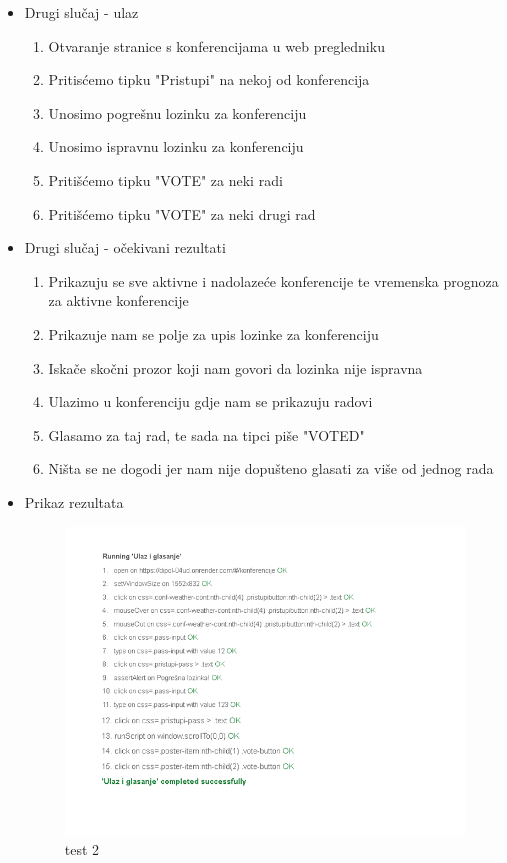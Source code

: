 			 \begin{itemize}
			 	\item Drugi slučaj - ulaz
			 	\begin{enumerate}
			 		\item Otvaranje stranice s konferencijama u web pregledniku
			 		\item Pritisćemo tipku "Pristupi" na nekoj od konferencija
			 		\item Unosimo pogrešnu lozinku za konferenciju
			 		\item Unosimo ispravnu lozinku za konferenciju
			 		\item Pritišćemo tipku "VOTE" za neki radi
			 		\item Pritišćemo tipku "VOTE" za neki drugi rad
			 	\end{enumerate}
			 	\item Drugi slučaj - očekivani rezultati
			 	\begin{enumerate}
			 		\item Prikazuju se sve aktivne i nadolazeće konferencije te vremenska prognoza za aktivne konferencije
			 		\item Prikazuje nam se polje za upis lozinke za konferenciju
			 		\item Iskače skočni prozor koji nam govori da lozinka nije ispravna
			 		\item Ulazimo u konferenciju gdje nam se prikazuju radovi
			 		\item Glasamo za taj rad, te sada na tipci piše "VOTED"
			 		\item Ništa se ne dogodi jer nam nije dopušteno glasati za više od jednog rada
			 	\end{enumerate}
			 	\item Prikaz rezultata
			 	\begin{figure}[htb]
			 		\centering
			 		\includegraphics[width=11cm]{slike/test_2.png}
			 		\caption{test 2}
			 		\label{fig:fer-logo}
			 	\end{figure}
			 \end{itemize}
			 
